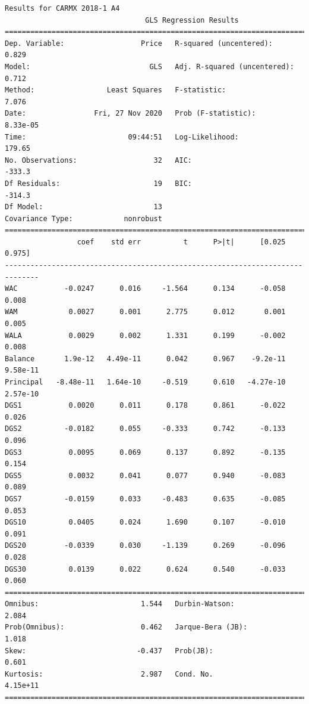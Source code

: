 \documentclass{article}
\begin{document}
\begin{verbatim}
Results for CARMX 2018-1 A4
                                 GLS Regression Results                                
=======================================================================================
Dep. Variable:                  Price   R-squared (uncentered):                   0.829
Model:                            GLS   Adj. R-squared (uncentered):              0.712
Method:                 Least Squares   F-statistic:                              7.076
Date:                Fri, 27 Nov 2020   Prob (F-statistic):                    8.33e-05
Time:                        09:44:51   Log-Likelihood:                          179.65
No. Observations:                  32   AIC:                                     -333.3
Df Residuals:                      19   BIC:                                     -314.3
Df Model:                          13                                                  
Covariance Type:            nonrobust                                                  
==============================================================================
                 coef    std err          t      P>|t|      [0.025      0.975]
------------------------------------------------------------------------------
WAC           -0.0247      0.016     -1.564      0.134      -0.058       0.008
WAM            0.0027      0.001      2.775      0.012       0.001       0.005
WALA           0.0029      0.002      1.331      0.199      -0.002       0.008
Balance       1.9e-12   4.49e-11      0.042      0.967    -9.2e-11    9.58e-11
Principal   -8.48e-11   1.64e-10     -0.519      0.610   -4.27e-10    2.57e-10
DGS1           0.0020      0.011      0.178      0.861      -0.022       0.026
DGS2          -0.0182      0.055     -0.333      0.742      -0.133       0.096
DGS3           0.0095      0.069      0.137      0.892      -0.135       0.154
DGS5           0.0032      0.041      0.077      0.940      -0.083       0.089
DGS7          -0.0159      0.033     -0.483      0.635      -0.085       0.053
DGS10          0.0405      0.024      1.690      0.107      -0.010       0.091
DGS20         -0.0339      0.030     -1.139      0.269      -0.096       0.028
DGS30          0.0139      0.022      0.624      0.540      -0.033       0.060
==============================================================================
Omnibus:                        1.544   Durbin-Watson:                   2.084
Prob(Omnibus):                  0.462   Jarque-Bera (JB):                1.018
Skew:                          -0.437   Prob(JB):                        0.601
Kurtosis:                       2.987   Cond. No.                     4.15e+11
==============================================================================


\end{verbatim}
\end{document}
